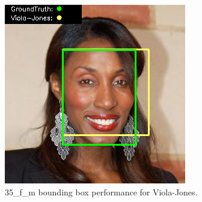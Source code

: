 \documentclass{l4proj}
\begin{document}
\begin{appendices}
\begin{figure}[h!]
\begin{minipage}{0.49\textwidth}
     \includegraphics[width=\textwidth]{images/appendix/viola/35.png}
    \caption{35\_f\_m bounding box performance for Viola-Jones.}
    \label{whoopi_result}
  \end{minipage}
\end{figure}


\end{appendices}
\end{document}
